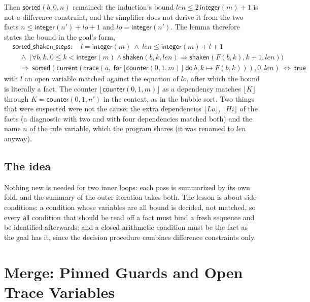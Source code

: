 \documentclass[11pt,a4paper]{article}
\newcommand{\bl}[1]{\lfloor #1\rfloor}                       %
\newcommand{\tr}[3]{\mathsf{trace}(#1,\ \mathsf{for}\ #2\ \mathsf{do}\ #3)}
\newcommand{\cnt}{\mathsf{counter}}
\newcommand{\cur}{\mathsf{current}}
\newcommand{\intf}{\mathsf{integer}}
\newcommand{\sorted}{\mathsf{sorted}}
\newcommand{\lemma}[1]{\textsf{#1}}
\begin{document}
Then $\sorted(b, 0, n)$ remained: the induction's bound $len \le 2\,\intf(m) + 1$ is not a difference
constraint, and the simplifier does not derive it from the two facts $n \le \intf(n') + lo + 1$ and
$lo = \intf(n')$. The lemma therefore states the bound in the goal's form,
\begin{align*}
  &\lemma{sorted\_shaken\_steps}:\quad l = \intf(m)\ \wedge\ len \le \intf(m) + l + 1\\
  &\quad\wedge\ \big(\forall b, k.\ 0 \le k < \intf(m) \wedge \mathsf{shaken}(b, k, len) \Longrightarrow \mathsf{shaken}(F(b, k), k + 1, len)\big)\\
  &\quad\Longrightarrow\ \sorted(\cur(\tr{a}{\bl{\cnt(0, 1, m)}}{b, k \mapsto F(b, k)}), 0, len)\ \Longleftrightarrow\ \mathsf{true}
\end{align*}
with $l$ an open variable matched against the equation of $lo$, after which the bound is literally a fact.
The counter $\bl{\cnt(0, 1, m)}$ as a dependency matches $\bl{K}$ through $K = \cnt(0, 1, n')$ in the
context, as in the bubble sort. Two things that were suspected were not the cause: the extra dependencies
$\bl{Lo}$, $\bl{Hi}$ of the facts (a diagnostic with two and with four dependencies matched both) and the
name $n$ of the rule variable, which the program shares (it was renamed to $len$ anyway).

\subsection{The idea}
Nothing new is needed for two inner loops: each pass is summarized by its own fold, and the summary of
the outer iteration takes both. The lesson is about side conditions: a condition whose variables are all
bound is decided, not matched, so every $\mathsf{all}$ condition that should be read off a fact must bind a
fresh sequence and be identified afterwards; and a closed arithmetic condition must be the fact as the goal
has it, since the decision procedure combines difference constraints only.

\section{Merge: Pinned Guards and Open Trace Variables}\label{sec:merge}
\end{document}
